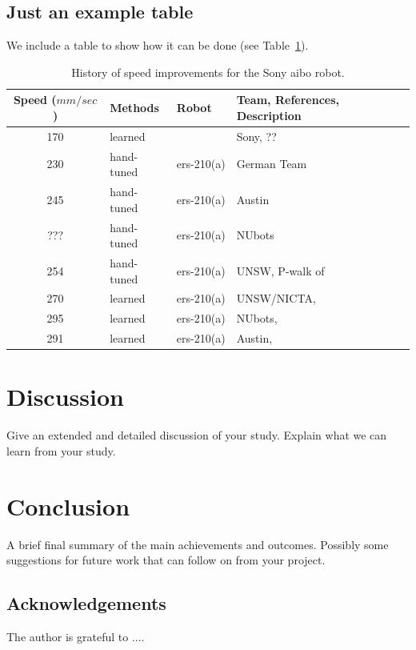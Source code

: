 \documentclass[a4,12pt]{article}
\newenvironment{boxit}{\begin{lrbox}{\savepar}
        \begin{minipage}[b]{4.6in}}
        {\end{minipage}\end{lrbox}\fbox{\usebox{\savepar}}}
\begin{document}
\subsection{Just an example table}
We include a table to show how it can be done (see Table~\ref{table:ListOfVelocities}).
%
\begin{table}[h!]
\begin{center}
\leavevmode
\small %
\begin{tabular}{|cll|l|}\hline
%
Speed (${mm}/{sec}$) & Methods & Robot & Team, References, Description\\[0.1cm]\hline
%
170& learned & & Sony, \citep{HornbyEtAl1999}??\\%
%
230& hand-tuned & {\sc ers}-210(a) & German Team  \\%
%
245& hand-tuned & {\sc ers}-210(a) &Austin  \\%
%
???& hand-tuned & {\sc ers}-210(a) &NUbots  \\%
%
254& hand-tuned & {\sc ers}-210(a) &UNSW, P-walk of \citep{HengstEtAl2001}\\%
%
270& learned & {\sc ers}-210(a) &UNSW/NICTA, \citep{KimUther2003}\\%
%
295& learned & {\sc ers}-210(a) &NUbots,
\citep{QuinlanChalupMiddletonACRA2003}\\%
%
291& learned & {\sc ers}-210(a) &Austin, \citep{KohlStone2004}\\\hline
%
\end{tabular}
\end{center}
\caption{History of speed improvements for the Sony {\sc aibo}
robot.} \label{table:ListOfVelocities}
\end{table}
%
\section{Discussion}
%
Give an extended and detailed discussion of your study. Explain what we can learn from your study.
%
\section{Conclusion}
%
A brief final summary of the main achievements and outcomes. Possibly some suggestions for future work that can follow on from your project.%
%
\subsection*{Acknowledgements}
The author is grateful to ....
%
\vskip 0.2in


\end{document}
